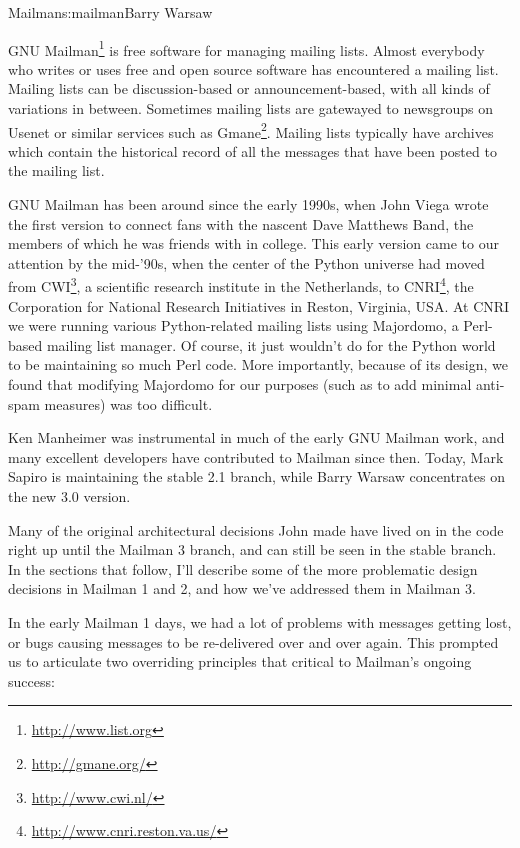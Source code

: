 \begin{aosachapter}{Mailman}{s:mailman}{Barry Warsaw}

GNU Mailman\footnote{\url{http://www.list.org}} is free software for
managing mailing lists.  Almost everybody who writes or uses free and
open source software has encountered a mailing list.  Mailing
lists can be discussion-based or announcement-based, with all kinds of
variations in between.  Sometimes mailing lists are gatewayed to
newsgroups on Usenet or similar services such as
Gmane\footnote{\url{http://gmane.org/}}.  Mailing lists typically have
archives which contain the historical record of all the messages that
have been posted to the mailing list.

GNU Mailman has been around since the early 1990s, when John Viega
wrote the first version to connect fans with the nascent Dave Matthews
Band, the members of which he was friends with in college.  This early version came to
our attention by the mid-'90s, when the center of the Python universe
had moved from CWI\footnote{\url{http://www.cwi.nl/}}, a scientific research institute in the
Netherlands, to CNRI\footnote{\url{http://www.cnri.reston.va.us/}}, 
the Corporation for National Research Initiatives in
Reston, Virginia, USA.  At CNRI we were running various
Python-related mailing lists using Majordomo, a Perl-based mailing
list manager.  Of course, it just wouldn't do for the Python world to
be maintaining so much Perl code.  More importantly, because of its
design, we found that modifying Majordomo for our purposes (such as to
add minimal anti-spam measures) was too difficult.  

Ken Manheimer was
instrumental in much of the early GNU Mailman work, and many excellent
developers have contributed to Mailman since then.  Today, Mark Sapiro
is maintaining the stable 2.1 branch, while Barry Warsaw concentrates
on the new 3.0 version.

Many of the original architectural decisions John made have lived on
in the code right up until the Mailman 3 branch, and can still be seen
in the stable branch.  In the sections that follow, I'll describe some
of the more problematic design decisions in Mailman 1 and 2, and how
we've addressed them in Mailman 3.

In the early Mailman 1 days, we had a lot of problems with messages
getting lost, or bugs causing messages to be re-delivered over and
over again.  This prompted us to articulate two overriding principles
that critical to Mailman's ongoing success:


\end{aosachapter}

